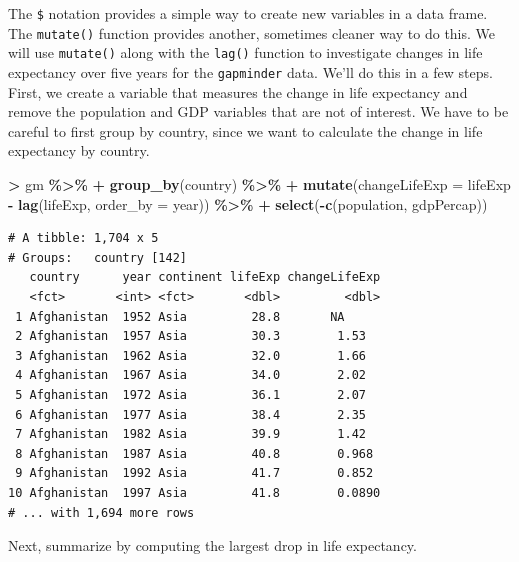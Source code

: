 \documentclass[
]{krantz}
\makeatletter
\newenvironment{Shaded}{\begin{snugshade}}{\end{snugshade}}
\newcommand{\DataTypeTok}[1]{\textcolor[rgb]{0.27,0.27,0.27}{#1}}
\newcommand{\KeywordTok}[1]{\textcolor[rgb]{0.27,0.27,0.27}{\textbf{#1}}}
\newcommand{\NormalTok}[1]{#1}
\newcommand{\OperatorTok}[1]{\textcolor[rgb]{0.43,0.43,0.43}{\textbf{#1}}}
\newcommand{\StringTok}[1]{\textcolor[rgb]{0.5,0.5,0.5}{#1}}
\newenvironment{kframe}{%
\medskip{}
\setlength{\fboxsep}{.8em}
 \def\at@end@of@kframe{}%
 \ifinner\ifhmode%
  \def\at@end@of@kframe{\end{minipage}}%
  \begin{minipage}{\columnwidth}%
 \fi\fi%
 \def\FrameCommand##1{\hskip\@totalleftmargin \hskip-\fboxsep
 \colorbox{shadecolor}{##1}\hskip-\fboxsep
     \hskip-\linewidth \hskip-\@totalleftmargin \hskip\columnwidth}%
 \MakeFramed {\advance\hsize-\width
   \@totalleftmargin\z@ \linewidth\hsize
   \@setminipage}}%
 {\par\unskip\endMakeFramed%
 \at@end@of@kframe}
\renewenvironment{Shaded}{\begin{kframe}}{\end{kframe}}
\makeatother
\begin{document}
The \texttt{\$} notation provides a simple way to create new variables in a data frame. The \texttt{mutate()} function provides another, sometimes cleaner way to do this. We will use \texttt{mutate()} along with the \texttt{lag()} function to investigate changes in life expectancy over five years for the \texttt{gapminder} data. We'll do this in a few steps. First, we create a variable that measures the change in life expectancy and remove the population and GDP variables that are not of interest. We have to be careful to first group by country, since we want to calculate the change in life expectancy by country.

\begin{Shaded}
\begin{Highlighting}[]
\OperatorTok{\textgreater{}}\StringTok{ }\NormalTok{gm }\OperatorTok{\%\textgreater{}\%}\StringTok{ }
\OperatorTok{+}\StringTok{   }\KeywordTok{group\_by}\NormalTok{(country) }\OperatorTok{\%\textgreater{}\%}\StringTok{ }
\OperatorTok{+}\StringTok{   }\KeywordTok{mutate}\NormalTok{(}\DataTypeTok{changeLifeExp =}\NormalTok{ lifeExp }\OperatorTok{{-}}\StringTok{ }\KeywordTok{lag}\NormalTok{(lifeExp, }\DataTypeTok{order\_by =}\NormalTok{ year)) }\OperatorTok{\%\textgreater{}\%}\StringTok{ }
\OperatorTok{+}\StringTok{   }\KeywordTok{select}\NormalTok{(}\OperatorTok{{-}}\KeywordTok{c}\NormalTok{(population, gdpPercap))}
\end{Highlighting}
\end{Shaded}

\begin{verbatim}
# A tibble: 1,704 x 5
# Groups:   country [142]
   country      year continent lifeExp changeLifeExp
   <fct>       <int> <fct>       <dbl>         <dbl>
 1 Afghanistan  1952 Asia         28.8       NA     
 2 Afghanistan  1957 Asia         30.3        1.53  
 3 Afghanistan  1962 Asia         32.0        1.66  
 4 Afghanistan  1967 Asia         34.0        2.02  
 5 Afghanistan  1972 Asia         36.1        2.07  
 6 Afghanistan  1977 Asia         38.4        2.35  
 7 Afghanistan  1982 Asia         39.9        1.42  
 8 Afghanistan  1987 Asia         40.8        0.968 
 9 Afghanistan  1992 Asia         41.7        0.852 
10 Afghanistan  1997 Asia         41.8        0.0890
# ... with 1,694 more rows
\end{verbatim}

Next, summarize by computing the largest drop in life expectancy.
\end{document}
